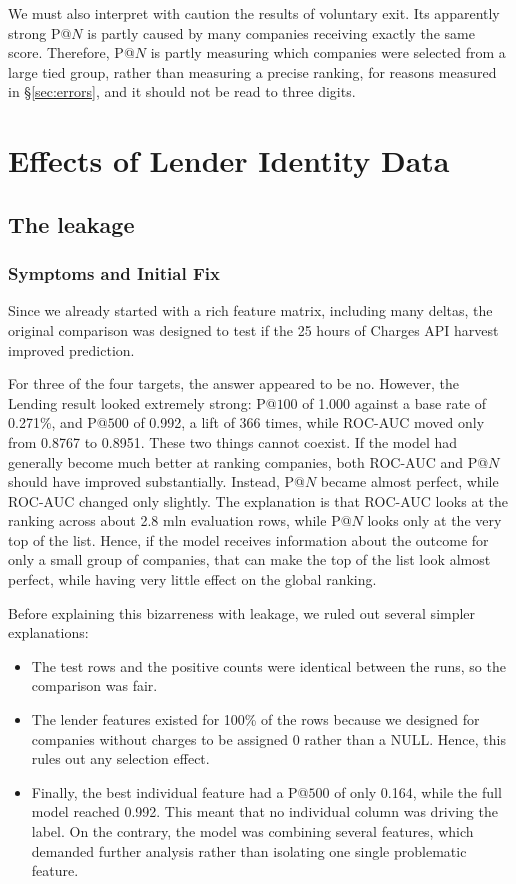 \documentclass[    author={Samuel Menon Demelo; Sneha Saphala Ram Prasad; 
Viktor Ander Lindholm; Vishal Khatri},
               supervisor={Prof. Fernando Moreno-Pino},
                   degree={MSc},
                    title={Lloyds Commercial Banking Intelligence},
                 subtitle={Ranking SME Lending, Risk and Growth Prospects for Lloyds Banking Group},
                     type={},
                     year={2026}]{dissertation}
\begin{document}
We must also interpret with caution the results of voluntary exit. Its apparently strong P@$N$ is partly caused by many companies receiving exactly the same score. Therefore, P@$N$ is partly measuring which companies were selected from a large tied group, rather than measuring a precise ranking, for reasons measured in \S\ref{sec:errors}, and it should not be read to three digits.

\section{Effects of Lender Identity Data}
\subsection{The leakage}
\subsubsection{Symptoms and Initial Fix}
\label{sec:leak}
Since we already started with a rich feature matrix, including many deltas, the original comparison was designed to test if the 25 hours of Charges API harvest improved prediction. 

For three of the four targets, the answer appeared to be no. However, the Lending result looked extremely strong: P@$100$ of 1.000 against a base rate of 0.271\%, and
P@$500$ of 0.992, a lift of 366 times, while ROC-AUC moved only from 0.8767 to 0.8951. These two things cannot coexist. If the model had generally become much better at ranking companies, both ROC-AUC and P@$N$ should have improved substantially. Instead, P@$N$ became almost perfect, while ROC-AUC changed only slightly. The explanation is that ROC-AUC looks at the ranking across about 2.8 mln evaluation rows, while P@$N$ looks only at the very top of the list. Hence, if the model receives information about the outcome for only a small group of companies, that can make the top of the list look almost perfect, while having very little effect on the global ranking.

Before explaining this bizarreness with leakage, we ruled out several simpler explanations:
\begin{itemize}
    \item The test rows and the positive counts were identical between the runs, so the comparison was fair.
    \item The lender features existed for 100\% of the rows because we designed for companies without charges to be assigned $0$ rather than a NULL. Hence, this rules out any selection effect.
    \item Finally, the best individual feature had a P@$500$ of only 0.164, while the full model reached 0.992. This meant that no individual column was driving the label. On the contrary, the model was combining several features, which demanded further analysis rather than isolating one single problematic feature.
\end{itemize}
\end{document}

